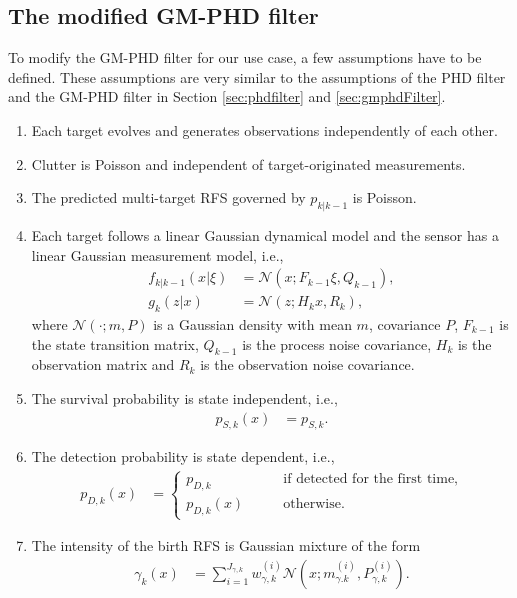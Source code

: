 \subsection{The modified GM-PHD filter}
To modify the GM-PHD filter for our use case, a few assumptions have to be defined. These assumptions are very
similar to the
assumptions of the PHD filter and the GM-PHD filter in Section \ref{sec:phdfilter} and \ref{sec:gmphdFilter}.
\begin{enumerate}
  \item Each target evolves and generates observations independently of each other. \label{as:mphd_1}
  \item Clutter is Poisson and independent of target-originated measurements. \label{as:mphd_2}
  \item The predicted multi-target RFS governed by $p_{k|k-1}$ is Poisson. \label{as:mphd_3}
  \item Each target follows a linear Gaussian dynamical model and the sensor has a linear \label{as:mphd_4}
  Gaussian measurement model, i.e.,
  \begin{align}
    f_{k|k-1}(x|\xi) &= \mathcal{N}(x; F_{k-1}\xi, Q_{k-1}),\\
    g_k(z|x) &= \mathcal{N}(z;H_kx, R_k),
  \end{align}
  where $\mathcal{N}(\cdot;m,P)$ is a Gaussian density with mean $m$, covariance $P$, $F_{k-1}$ is the state
  transition matrix, $Q_{k-1}$ is the process noise covariance, $H_k$ is the observation matrix and $R_k$ is the observation noise covariance.
  \item The survival probability is state independent, i.e.,
  \begin{align}
    p_{S,k}(x) &= p_{S,k}.
  \end{align}
    \label{as:mphd_5}
  \item The detection probability is state dependent, i.e.,
    \begin{align}
      p_{D,k}(x) &= 
      \begin{cases}
         p_{D,k} &\qquad \text{if detected for the first time,} \\
         p_{D,k}(x) &\qquad \text{otherwise.}
      \end{cases}
    \end{align}
    \label{as:mphd_6}
  \item The intensity of the birth RFS is Gaussian mixture of the form
  \begin{align}
    \gamma_k(x) &= \sum_{i=1}^{J_{\gamma,k}}w_{\gamma,k}^{(i)} \mathcal{N}(x; m_{\gamma.k}^{(i)}, P_{\gamma,k}^{(i)}).
    \label{eq:mphd_intensity}
  \end{align}
  \label{as:mphd_7}
\end{enumerate}

